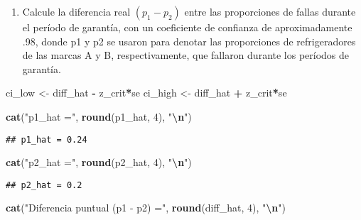 \documentclass[
]{article}
\newenvironment{Shaded}{\begin{snugshade}}{\end{snugshade}}
\newcommand{\DecValTok}[1]{\textcolor[rgb]{0.00,0.00,0.81}{#1}}
\newcommand{\FunctionTok}[1]{\textcolor[rgb]{0.13,0.29,0.53}{\textbf{#1}}}
\newcommand{\NormalTok}[1]{#1}
\newcommand{\OtherTok}[1]{\textcolor[rgb]{0.56,0.35,0.01}{#1}}
\newcommand{\SpecialCharTok}[1]{\textcolor[rgb]{0.81,0.36,0.00}{\textbf{#1}}}
\newcommand{\StringTok}[1]{\textcolor[rgb]{0.31,0.60,0.02}{#1}}
\providecommand{\tightlist}{%
  \setlength{\itemsep}{0pt}\setlength{\parskip}{0pt}}
\begin{document}
\begin{enumerate}
\def\labelenumi{\alph{enumi})}
\tightlist
\item
  Calcule la diferencia real \((p_1 - p_2)\) entre las proporciones de
  fallas durante el período de garantía, con un coeficiente de confianza
  de aproximadamente .98, donde p1 y p2 se usaron para denotar las
  proporciones de refrigeradores de las marcas A y B, respectivamente,
  que fallaron durante los períodos de garantía.
\end{enumerate}

\begin{Shaded}
\begin{Highlighting}[]
\NormalTok{ci\_low  }\OtherTok{\textless{}{-}}\NormalTok{ diff\_hat }\SpecialCharTok{{-}}\NormalTok{ z\_crit}\SpecialCharTok{*}\NormalTok{se}
\NormalTok{ci\_high }\OtherTok{\textless{}{-}}\NormalTok{ diff\_hat }\SpecialCharTok{+}\NormalTok{ z\_crit}\SpecialCharTok{*}\NormalTok{se}

\FunctionTok{cat}\NormalTok{(}\StringTok{"p1\_hat ="}\NormalTok{, }\FunctionTok{round}\NormalTok{(p1\_hat, }\DecValTok{4}\NormalTok{), }\StringTok{"}\SpecialCharTok{\textbackslash{}n}\StringTok{"}\NormalTok{)}
\end{Highlighting}
\end{Shaded}

\begin{verbatim}
## p1_hat = 0.24
\end{verbatim}

\begin{Shaded}
\begin{Highlighting}[]
\FunctionTok{cat}\NormalTok{(}\StringTok{"p2\_hat ="}\NormalTok{, }\FunctionTok{round}\NormalTok{(p2\_hat, }\DecValTok{4}\NormalTok{), }\StringTok{"}\SpecialCharTok{\textbackslash{}n}\StringTok{"}\NormalTok{)}
\end{Highlighting}
\end{Shaded}

\begin{verbatim}
## p2_hat = 0.2
\end{verbatim}

\begin{Shaded}
\begin{Highlighting}[]
\FunctionTok{cat}\NormalTok{(}\StringTok{"Diferencia puntual (p1 {-} p2) ="}\NormalTok{, }\FunctionTok{round}\NormalTok{(diff\_hat, }\DecValTok{4}\NormalTok{), }\StringTok{"}\SpecialCharTok{\textbackslash{}n}\StringTok{"}\NormalTok{)}
\end{Highlighting}
\end{Shaded}
\end{document}
